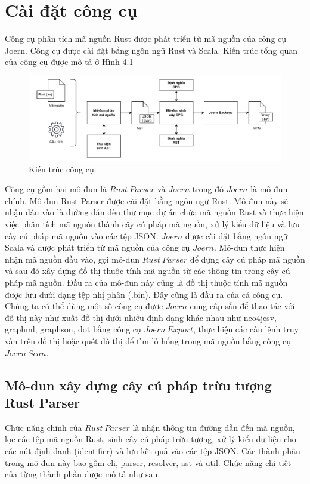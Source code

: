 \section{Cài đặt công cụ}

Công cụ phân tích mã nguồn Rust được phát triển từ mã nguồn của công cụ Joern.
Công cụ được cài đặt bằng ngôn ngữ Rust và Scala. Kiến trúc tổng quan của công cụ được
mô tả ở Hình 4.1

\begin{figure}[H]
	\includegraphics[width=1\columnwidth]{figures/c4/c4_install_flow.drawio.pdf}
	\centering
	\caption{Kiến trúc công cụ.}
	\label{img:c4_install_flow}
\end{figure}

Công cụ gồm hai mô-đun là $Rust\ Parser$ và $Joern$ trong đó $Joern$ là mô-đun
chính. Mô-đun Rust Parser được cài đặt bằng ngôn ngữ Rust. Mô-đun này sẽ nhận đầu vào là
đường dẫn đến thư mục dự án chứa mã nguồn Rust và thực hiện việc phân tích mã nguồn
thành cây cú pháp mã nguồn, xử lý kiểu dữ liệu và lưu cây cú pháp mã nguồn vào các
tệp JSON. $Joern$ được cài đặt bằng ngôn ngữ Scala và được phát triển từ mã nguồn
của công cụ $Joern$. Mô-đun thực hiện nhận mã nguồn đầu vào, gọi mô-đun $Rust\ Parser$ để
dựng cây cú pháp mã nguồn và sau đó xây dựng đồ thị thuộc tính mã nguồn từ các thông
tin trong cây cú pháp mã nguồn. Đầu ra của mô-đun này cũng là đồ thị thuộc tính mã
nguồn được lưu dưới dạng tệp nhị phân (.bin). Đây cũng là đầu ra của cả công cụ. Chúng
ta có thể dùng một số công cụ được $Joern$ cung cấp sẵn để thao tác với đồ thị này như xuất đồ thị dưới nhiều định dạng khác nhau như neo4jcsv, graphml, graphson, dot bằng
công cụ $Joern\ Export$, thực hiện các câu lệnh truy vấn trên đồ thị hoặc quét đồ thị để tìm
lỗ hổng trong mã nguồn bằng công cụ $Joern\ Scan$.

\subsection{Mô-đun xây dựng cây cú pháp trừu tượng Rust Parser}

Chức năng chính của $Rust\ Parser$ là nhận thông tin đường dẫn đến mã nguồn, lọc các
tệp mã nguồn Rust, sinh cây cú pháp trừu tượng, xử lý kiểu dữ liệu cho các nút định danh
(identifier) và lưu kết quả vào các tệp JSON. Các thành phần trong mô-đun này bao gồm
cli, parser, resolver, ast và util. Chức năng chi tiết của từng thành phần được mô tả như
sau:

